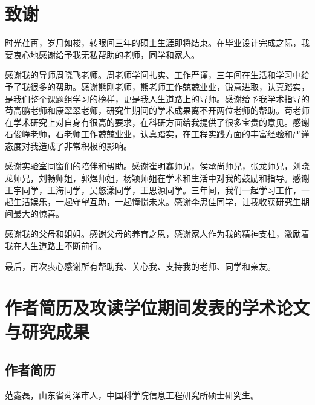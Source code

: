 
\chapter[致谢]{致\quad 谢}%
\thispagestyle{noheaderstyle}%

时光荏苒，岁月如梭，转眼间三年的硕士生涯即将结束。在毕业设计完成之际，我要衷心地感谢给予我无私帮助的老师，同学和家人。

感谢我的导师周晓飞老师。周老师学问扎实、工作严谨，三年间在生活和学习中给予了我很多的帮助。感谢熊刚老师，熊老师工作兢兢业业，锐意进取，认真踏实，是我们整个课题组学习的榜样，更是我人生道路上的导师。感谢给予我学术指导的苟高鹏老师和康翠翠老师，研究生期间的学术成果离不开两位老师的帮助。苟老师在学术研究上对自身有很高的要求，在科研方面给我提供了很多宝贵的意见。感谢石俊峥老师，石老师工作兢兢业业，认真踏实，在工程实践方面的丰富经验和严谨态度对我造成了非常积极的影响。

感谢实验室同窗们的陪伴和帮助。感谢崔明鑫师兄，侯承尚师兄，张龙师兄，刘晓龙师兄，刘畅师姐，郭煜师姐，杨颖师姐在学术和生活中对我的鼓励和指导。感谢王宇同学，王海同学，吴悠漾同学，王思源同学。三年间，我们一起学习工作，一起生活娱乐，一起守望互助，一起憧憬未来。感谢李思佳同学，让我收获研究生期间最大的惊喜。

感谢我的父母和姐姐。感谢父母的养育之恩，感谢家人作为我的精神支柱，激励着我在人生道路上不断前行。

最后，再次衷心感谢所有帮助我、关心我、支持我的老师、同学和亲友。

\chapter{作者简历及攻读学位期间发表的学术论文与研究成果}

\section*{作者简历}

范鑫磊，山东省菏泽市人，中国科学院信息工程研究所硕士研究生。


